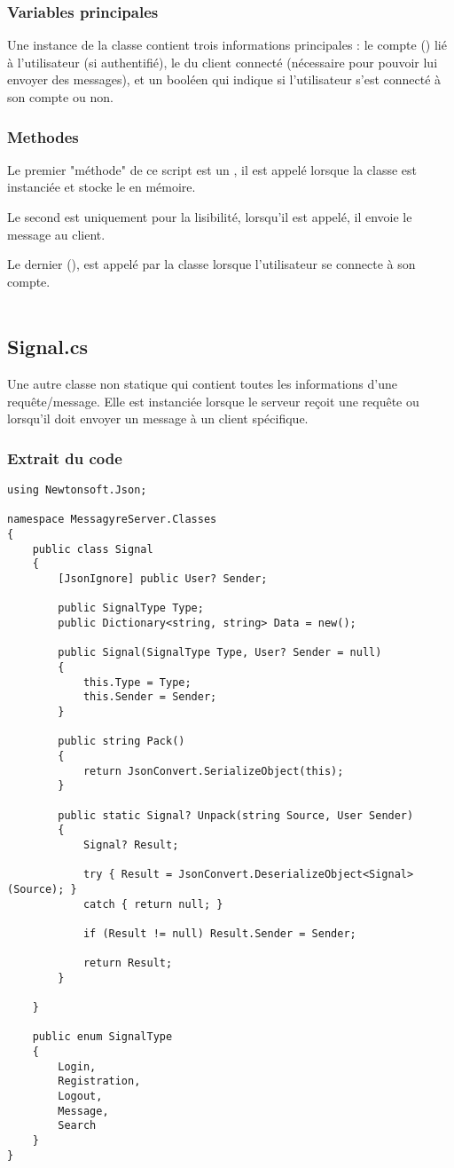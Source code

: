 \documentclass{article}
\begin{document}
\subsubsection{Variables principales}
Une instance de la classe  contient trois informations principales : le compte () lié à l'utilisateur (si authentifié), le  du client connecté (nécessaire pour pouvoir lui envoyer des messages), et un booléen  qui indique si l'utilisateur s'est connecté à son compte ou non.

\subsubsection{Methodes}
Le premier "méthode" de ce script est un , il est appelé lorsque la classe est instanciée et stocke le  en mémoire.

Le second est uniquement pour la lisibilité, lorsqu'il est appelé, il envoie le message  au client.

Le dernier (), est appelé par la classe  lorsque l'utilisateur se connecte à son compte.
\\\\

\subsection{Signal.cs}

Une autre classe non statique qui contient toutes les informations d'une requête/message. Elle est instanciée lorsque le serveur reçoit une requête ou lorsqu'il doit envoyer un message à un client spécifique.

\subsubsection{Extrait du code}

\begin{verbatim}
using Newtonsoft.Json;

namespace MessagyreServer.Classes
{
	public class Signal
	{
		[JsonIgnore] public User? Sender;

		public SignalType Type;
		public Dictionary<string, string> Data = new();

		public Signal(SignalType Type, User? Sender = null)
		{
			this.Type = Type;
			this.Sender = Sender;
		}

		public string Pack()
		{
			return JsonConvert.SerializeObject(this);
		}
			
		public static Signal? Unpack(string Source, User Sender)
		{
			Signal? Result;

			try { Result = JsonConvert.DeserializeObject<Signal>(Source); }
			catch { return null; }

			if (Result != null) Result.Sender = Sender;

			return Result;
		}
		
	}

	public enum SignalType
	{
		Login, 
		Registration, 
		Logout,
		Message,
		Search
	}
}
\end{verbatim}
\end{document}
